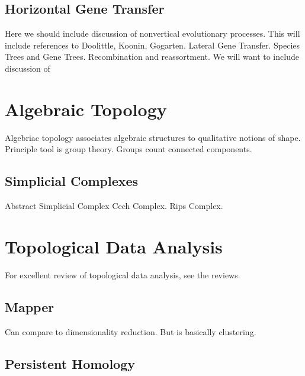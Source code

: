\subsection{Horizontal Gene Transfer}

Here we should include discussion of nonvertical evolutionary processes.
This will include references to Doolittle, Koonin, Gogarten.
Lateral Gene Transfer.
Species Trees and Gene Trees.
Recombination and reassortment.
We will want to include discussion of 

\section{Algebraic Topology}

Algebriac topology associates algebraic structures to qualitative notions of shape.
Principle tool is group theory.
Groups count connected components.

\subsection{Simplicial Complexes}

Abstract Simplicial Complex
Cech Complex.
Rips Complex.

\section{Topological Data Analysis}

For excellent review of topological data analysis, see the reviews.

\subsection{Mapper}

Can compare to dimensionality reduction.
But is basically clustering.

\subsection{Persistent Homology}
\label{subsec:persistent_homology}

